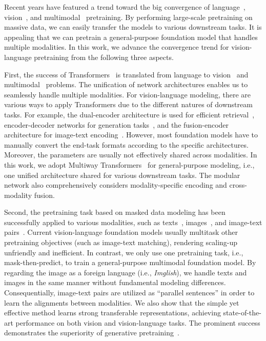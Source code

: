\documentclass{article}
\newcommand\multiway{Multiway Transformers}
\begin{document}
Recent years have featured a trend toward the big convergence of language~\citep{gpt,bert,unilm}, vision~\citep{beit,beitv2}, and multimodal~\citep{vlmo,clip,coca} pretraining.
By performing large-scale pretraining on massive data, we can easily transfer the models to various downstream tasks.
It is appealing that we can pretrain a general-purpose foundation model that handles multiple modalities.
In this work, we advance the convergence trend for vision-language pretraining from the following three aspects.

First, the success of Transformers~\citep{transformer} is translated from language to vision~\citep{vit} and multimodal~\citep{vilt,vlmo} problems.
The unification of network architectures enables us to seamlessly handle multiple modalities.
For vision-language modeling, there are various ways to apply Transformers due to the different natures of downstream tasks.
For example, the dual-encoder architecture is used for efficient retrieval~\citep{clip}, encoder-decoder networks for generation tasks~\citep{simvlm}, and the fusion-encoder architecture for image-text encoding~\citep{vilt}.
However, most foundation models have to manually convert the end-task formats according to the specific architectures. Moreover, the parameters are usually not effectively shared across modalities.
In this work, we adopt \multiway{}~\citep{vlmo} for general-purpose modeling, i.e., one unified architecture shared for various downstream tasks. The modular network also comprehensively considers modality-specific encoding and cross-modality fusion.

Second, the pretraining task based on masked data modeling has been successfully applied to various modalities, such as texts~\citep{bert}, images~\citep{beit,beitv2}, and image-text pairs~\citep{vlbeit}.
Current vision-language foundation models usually multitask other pretraining objectives (such as image-text matching), rendering scaling-up unfriendly and inefficient.
In contrast, we only use one pretraining task, i.e., mask-then-predict, to train a general-purpose multimodal foundation model.
By regarding the image as a foreign language (i.e., \textit{Imglish}), we handle texts and images in the same manner without fundamental modeling differences.
Consequentially, image-text pairs are utilized as ``parallel sentences'' in order to learn the alignments between modalities.
We also show that the simple yet effective method learns strong transferable representations, achieving state-of-the-art performance on both vision and vision-language tasks.
The prominent success demonstrates the superiority of generative pretraining~\citep{bert,beit}.
\end{document}
